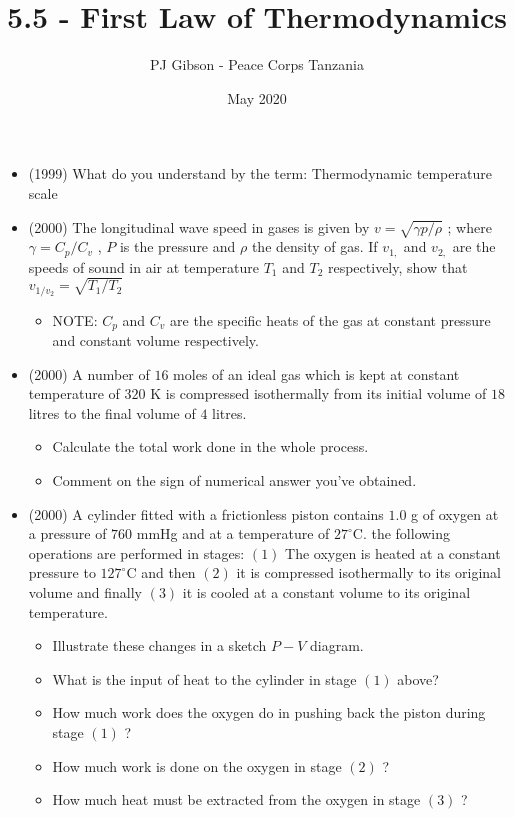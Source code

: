 \documentclass{article}
\title{\textbf{5.5 - First Law of Thermodynamics}}
\author{PJ Gibson - Peace Corps Tanzania}
\date{May 2020}
\begin{document}
\maketitle

\begin{itemize}
\item (1999)  What do you understand by the term: Thermodynamic temperature scale
\item (2000)  The longitudinal wave speed in gases is given by $ v=\sqrt{\gamma p/ \rho }$ ; where $ \gamma =C_{p}/C_{v}$ , $ P$ is the pressure and $ \rho $ the density of gas. If $ v_{1,}$ and $ v_{2,}$ are the speeds of sound in air at temperature $ T_{1}$ and $ T_{2}$ respectively, show that $ v_{1/v_2}=\sqrt{T_{1}/T_{2}}$
 \begin{itemize}
\item NOTE: $ C_{p}$ and $ C_{v}$ are the specific heats of the gas at constant pressure and constant volume respectively.
\end{itemize}
\item (2000)  A number of $ 16$ moles of an ideal gas which is kept at constant temperature of $ 320$ K is compressed isothermally from its initial volume of $ 18$ litres to the final volume of $ 4$ litres.
 \begin{itemize}
\item Calculate the total work done in the whole process.
\item Comment on the sign of numerical answer you've obtained.
\end{itemize}
\item (2000)  A cylinder fitted with a frictionless piston contains $ 1.0$ g of oxygen at a pressure of $ 760$ mmHg and at a temperature of $ 27^{\circ}$C. the following operations are performed in stages: $ (1)$ The oxygen is heated at a constant pressure to $ 127^{\circ}$C and then $ (2)$ it is compressed isothermally to its original volume and finally $ (3)$ it is cooled at a constant volume to its original temperature.
 \begin{itemize}
\item Illustrate these changes in a sketch $ P-V$ diagram.
\item What is the input of heat to the cylinder in stage $ (1)$ above?
\item How much work does the oxygen do in pushing back the piston during stage $ (1)$ ?
\item How much work is done on the oxygen in stage $ (2)$ ?
\item How much heat must be extracted from the oxygen in stage $ (3)$ ? 

\end{itemize}
\end{itemize}
\end{document}
